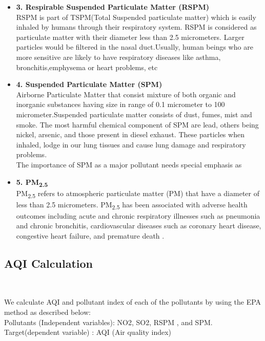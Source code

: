 \documentclass{article}
\begin{document}
\begin{itemize}
\begin{itemize}
    \item {\textbf{3. Respirable Suspended Particulate Matter (RSPM)}\\
    RSPM is part of TSPM(Total Suspended particulate matter) which is easily inhaled by humans through their respiratory system. RSPM is considered as particulate matter with their diameter less than 2.5 micrometers. Larger particles would be filtered in the nasal duct.Usually, human beings who are more sensitive are likely to have respiratory diseases like asthma, bronchitis,emphysema or heart problems, etc\textsuperscript{\cite{ref4}}
    }
    \item { \textbf{4. Suspended Particulate Matter (SPM)}\\
    Airborne Particulate Matter that consist mixture of both organic and inorganic substances having size in range of 0.1 micrometer to 100 micrometer.Suspended particulate matter consists of dust, fumes, mist and smoke. The most harmful chemical component of SPM are lead, others being nickel, arsenic, and those present in diesel exhaust. These particles when inhaled, lodge in our lung tissues and cause lung damage and respiratory problems.\\
    The importance of SPM as a major pollutant needs special emphasis as
    }
       
    \item {\textbf{5. PM\textsubscript{2.5}}\\
    PM\textsubscript{2.5} refers to atmospheric particulate matter (PM) that have a diameter of
    less than 2.5 micrometers.
   PM\textsubscript{2.5} has been associated with adverse health outcomes including acute and chronic respiratory
illnesses such as pneumonia and chronic bronchitis, cardiovascular diseases such as coronary heart
disease, congestive heart failure, and premature death .\textsuperscript{\cite{ref1,ref2,ref3}}}
    \end{itemize}
    
\subsection{\color{brown} AQI Calculation}\\
\begin{itemize}
     We calculate AQI and pollutant index of each of the pollutants by using the EPA method as described below:\\
     Pollutants (Independent variables): NO2, SO2, RSPM , and SPM.\\
    Target(dependent variable) : AQI (Air quality index)
    

\end{itemize}
\end{itemize}
\end{document}

